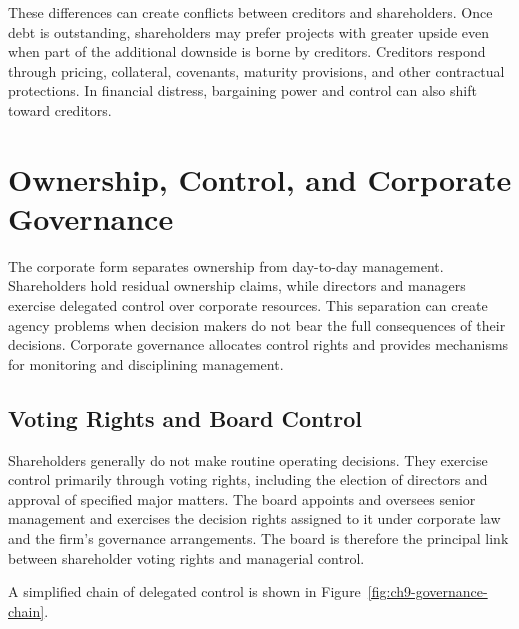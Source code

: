 These differences can create conflicts between creditors and shareholders. Once debt is outstanding, shareholders may prefer projects with greater upside even when part of the additional downside is borne by creditors. Creditors respond through pricing, collateral, covenants, maturity provisions, and other contractual protections. In financial distress, bargaining power and control can also shift toward creditors.


\section{Ownership, Control, and Corporate Governance}

The corporate form separates ownership from day-to-day management. Shareholders hold residual ownership claims, while directors and managers exercise delegated control over corporate resources. This separation can create agency problems when decision makers do not bear the full consequences of their decisions. Corporate governance allocates control rights and provides mechanisms for monitoring and disciplining management.

\subsection{Voting Rights and Board Control}

Shareholders generally do not make routine operating decisions. They exercise control primarily through voting rights, including the election of directors and approval of specified major matters. The board appoints and oversees senior management and exercises the decision rights assigned to it under corporate law and the firm's governance arrangements. The board is therefore the principal link between shareholder voting rights and managerial control.

A simplified chain of delegated control is shown in Figure~\ref{fig:ch9-governance-chain}.

